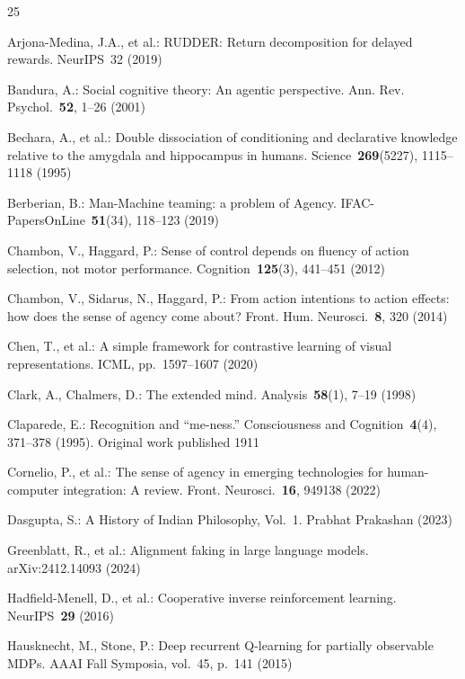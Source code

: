 \documentclass[runningheads]{llncs}
\begin{document}
\begin{thebibliography}{25}

Arjona-Medina, J.A., et al.:
RUDDER: Return decomposition for delayed rewards.
NeurIPS~32 (2019)

Bandura, A.:
Social cognitive theory: An agentic perspective.
Ann. Rev. Psychol.~\textbf{52}, 1--26 (2001)

Bechara, A., et al.:
Double dissociation of conditioning and declarative knowledge relative
to the amygdala and hippocampus in humans.
Science~\textbf{269}(5227), 1115--1118 (1995)

Berberian, B.:
Man-Machine teaming: a problem of Agency.
IFAC-PapersOnLine~\textbf{51}(34), 118--123 (2019)

Chambon, V., Haggard, P.:
Sense of control depends on fluency of action selection, not motor
performance. Cognition~\textbf{125}(3), 441--451 (2012)

Chambon, V., Sidarus, N., Haggard, P.:
From action intentions to action effects: how does the sense of agency
come about? Front. Hum. Neurosci.~\textbf{8}, 320 (2014)

Chen, T., et al.:
A simple framework for contrastive learning of visual representations.
ICML, pp.~1597--1607 (2020)

Clark, A., Chalmers, D.:
The extended mind.
Analysis~\textbf{58}(1), 7--19 (1998)

Claparede, E.:
Recognition and ``me-ness.''
Consciousness and Cognition~\textbf{4}(4), 371--378 (1995).
Original work published 1911

Cornelio, P., et al.:
The sense of agency in emerging technologies for human-computer
integration: A review.
Front. Neurosci.~\textbf{16}, 949138 (2022)

Dasgupta, S.:
A History of Indian Philosophy, Vol.~1.
Prabhat Prakashan (2023)

Greenblatt, R., et al.:
Alignment faking in large language models.
arXiv:2412.14093 (2024)

Hadfield-Menell, D., et al.:
Cooperative inverse reinforcement learning.
NeurIPS~\textbf{29} (2016)

Hausknecht, M., Stone, P.:
Deep recurrent Q-learning for partially observable MDPs.
AAAI Fall Symposia, vol.~45, p.~141 (2015)


\end{thebibliography}
\end{document}
